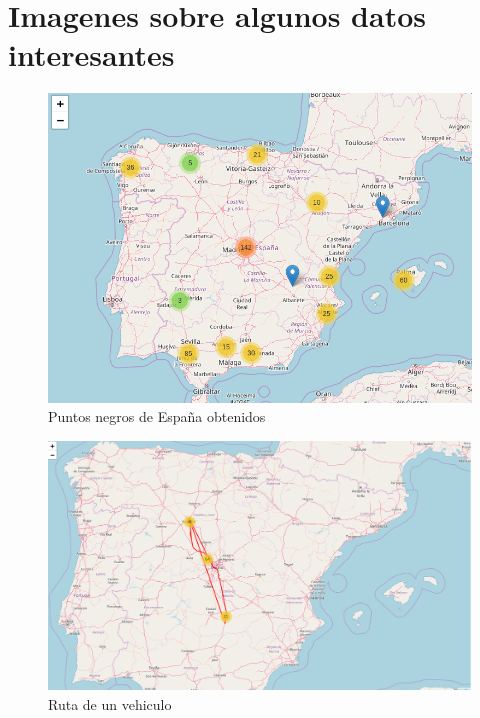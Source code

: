\chapter{Imagenes sobre algunos datos interesantes\label{apendA}}


\begin{figure}[htp]
\centering
\includegraphics[scale=.50]{Anexos/PuntosNegrosEspana.png}
\caption{Puntos negros de España obtenidos}
\label{blackShapes}
\end{figure}

\begin{figure}[htp]
\centering
\includegraphics[scale=.30]{Anexos/rutaDeUnVehiculo.png}
\caption{Ruta de un vehiculo}
\label{littleRoute}
\end{figure}



